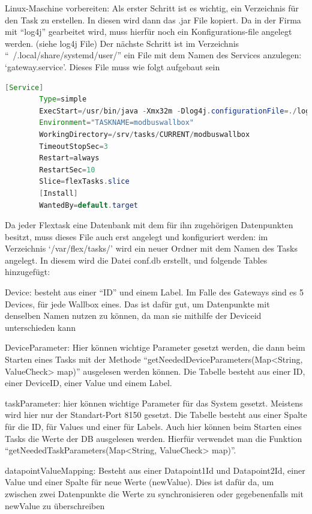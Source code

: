 \begin{compactenum}
    \item Linux-Maschine vorbereiten: Als erster Schritt ist es wichtig, ein Verzeichnis für den Task zu erstellen. In diesen wird dann das .jar File kopiert. Da in der Firma mit “log4j” gearbeitet wird, muss hierfür noch ein Konfigurations-file angelegt werden. (siehe log4j File) 
    Der nächste Schritt ist im Verzeichnis “~/.local/share/systemd/user/” ein File mit dem Namen des Services anzulegen: ‘gateway.service'. Dieses File muss wie folgt aufgebaut sein 
    \begin{lstlisting}[language=java,caption=Example Element,label=lst:impl:foo]
        [Service]
        Type=simple
        ExecStart=/usr/bin/java -Xmx32m -Dlog4j.configurationFile=./log4j2.xml -jar /srv/tasks/CURRENT/modbuswallbox/modbuswallbox.jar
        Environment="TASKNAME=modbuswallbox"
        WorkingDirectory=/srv/tasks/CURRENT/modbuswallbox
        TimeoutStopSec=3
        Restart=always
        RestartSec=10
        Slice=flexTasks.slice
        [Install]
        WantedBy=default.target
    \end{lstlisting}
    \item Da jeder Flextask eine Datenbank mit dem für ihn zugehörigen Datenpunkten besitzt, muss dieses File auch erst angelegt und konfiguriert werden: im Verzeichnis ‘/var/flex/tasks/’ wird ein neuer Ordner mit dem Namen des Tasks angelegt. In diesem wird die Datei conf.db erstellt, und folgende Tables hinzugefügt: 
    \begin{compactenum}
        \item Device: besteht aus einer “ID” und einem Label. Im Falle des Gateways sind es 5 Devices, für jede Wallbox eines. Das ist dafür gut, um Datenpunkte mit denselben Namen nutzen zu können, da man sie mithilfe der Deviceid unterschieden kann 
        \item DeviceParameter: Hier können wichtige Parameter gesetzt werden, die dann beim Starten eines Tasks mit der Methode “getNeededDeviceParameters(Map<String, ValueCheck> map)” ausgelesen werden können. Die Tabelle besteht aus einer ID, einer DeviceID, einer Value und einem Label. 
        \item taskParameter: hier können wichtige Parameter für das System gesetzt. Meistens wird hier nur der Standart-Port 8150 gesetzt. Die Tabelle besteht aus einer Spalte für die ID, für Values und einer für Labels. Auch hier können beim Starten eines Tasks die Werte der DB ausgelesen werden. Hierfür verwendet man die Funktion “getNeededTaskParameters(Map<String, ValueCheck> map)”. 
        \item datapointValueMapping: Besteht aus einer Datapoint1Id und Datapoint2Id, einer Value und einer Spalte für neue Werte (newValue). Dies ist dafür da, um zwischen zwei Datenpunkte die Werte zu synchronisieren oder gegebenenfalls mit newValue zu überschreiben 

\end{compactenum}
\end{compactenum}
